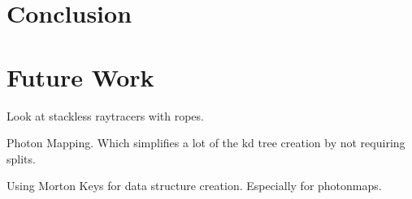 
\chapter{Conclusion}


\chapter{Future Work}

Look at stackless raytracers with ropes.

Photon Mapping. Which simplifies a lot of the kd tree creation by not
requiring splits.

Using Morton Keys for data structure creation. Especially for photonmaps.

